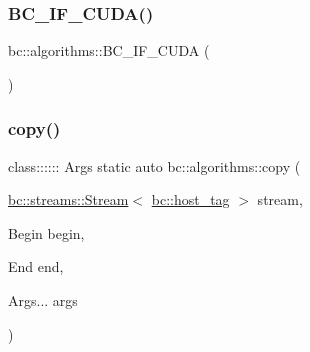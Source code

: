 \mbox{\label{namespacebc_1_1algorithms_abc8e0fa774625ec682265e98e18b5283}} 
\subsubsection{\texorpdfstring{B\+C\+\_\+\+I\+F\+\_\+\+C\+U\+D\+A()}{BC\_IF\_CUDA()}\hspace{0.1cm}{\footnotesize\ttfamily [31/31]}}
{\footnotesize\ttfamily bc\+::algorithms\+::\+B\+C\+\_\+\+I\+F\+\_\+\+C\+U\+DA (\begin{DoxyParamCaption}\item[{template$<$ class Begin, class End, class... Args $>$ static auto \hyperlink{namespacebc_1_1algorithms_afce1a4f97716bc7f382dd42dade0f257}{minmax\+\_\+element}(\hyperlink{classbc_1_1streams_1_1Stream}{bc\+::streams\+::\+Stream}$<$ \hyperlink{structbc_1_1device__tag}{bc\+::device\+\_\+tag} $>$ stream, Begin begin, End end, Args... args) \{ return thrust\+::minmax\+\_\+element(thrust\+::cuda\+::par.\+on(stream), begin, end, args...);\}}]{ }\end{DoxyParamCaption})}

\mbox{\label{namespacebc_1_1algorithms_a2f21a8743360da646967e9e2f402b560}} 
\subsubsection{\texorpdfstring{copy()}{copy()}}
{\footnotesize\ttfamily class\+:::::: Args static auto bc\+::algorithms\+::copy (\begin{DoxyParamCaption}\item[{\hyperlink{classbc_1_1streams_1_1Stream}{bc\+::streams\+::\+Stream}$<$ \hyperlink{structbc_1_1host__tag}{bc\+::host\+\_\+tag} $>$}]{stream,  }\item[{Begin}]{begin,  }\item[{End}]{end,  }\item[{Args...}]{args }\end{DoxyParamCaption})}

\mbox{\label{namespacebc_1_1algorithms_a1bae159c938465c4632a83a8fdbb5a0f}} 
